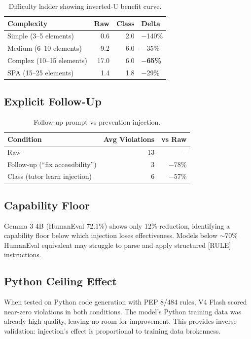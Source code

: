 \documentclass{article}
\begin{document}
\begin{table}[h]
\centering
\begin{tabular}{lrrl}
\toprule
Complexity & Raw & Class & Delta \\
\midrule
Simple (3--5 elements) & 0.6 & 2.0 & $-$140\% \\
Medium (6--10 elements) & 9.2 & 6.0 & $-$35\% \\
Complex (10--15 elements) & 17.0 & 6.0 & \textbf{$-$65\%} \\
SPA (15--25 elements) & 1.4 & 1.8 & $-$29\% \\
\bottomrule
\end{tabular}
\caption{Difficulty ladder showing inverted-U benefit curve.}\label{tab:diff}
\end{table}

\subsection{Explicit Follow-Up}

\begin{table}[h]
\centering
\begin{tabular}{lrr}
\toprule
Condition & Avg Violations & vs Raw \\
\midrule
Raw & 13 & -- \\
Follow-up (``fix accessibility'') & 3 & $-$78\% \\
Class (tutor learn injection) & 6 & $-$57\% \\
\bottomrule
\end{tabular}
\caption{Follow-up prompt vs prevention injection.}\label{tab:followup}
\end{table}

\subsection{Capability Floor}

Gemma 3 4B (HumanEval 72.1\%) shows only 12\% reduction, identifying a
capability floor below which injection loses effectiveness. Models below
$\sim$70\% HumanEval equivalent may struggle to parse and apply structured
[RULE] instructions.

\subsection{Python Ceiling Effect}

When tested on Python code generation with PEP 8/484 rules, V4 Flash scored
near-zero violations in both conditions. The model's Python training data was
already high-quality, leaving no room for improvement. This provides inverse
validation: injection's effect is proportional to training data brokenness.
\end{document}
